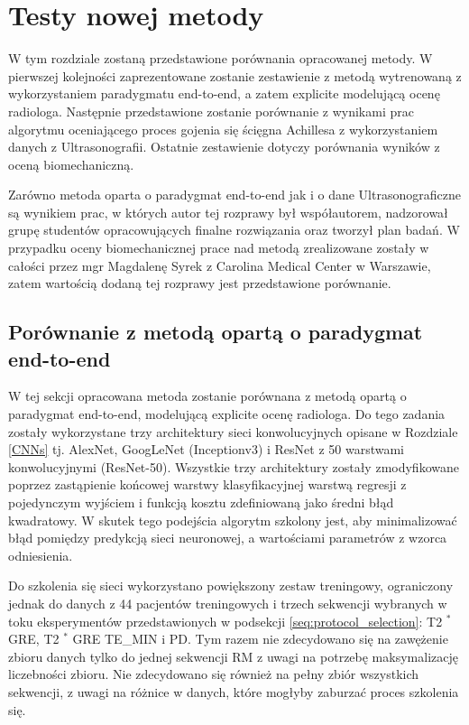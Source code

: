 \chapter{Testy nowej metody}

W tym rozdziale zostaną przedstawione porównania opracowanej metody. W pierwszej kolejności zaprezentowane zostanie zestawienie z metodą wytrenowaną z wykorzystaniem paradygmatu end-to-end, a zatem explicite modelującą ocenę radiologa. Następnie przedstawione zostanie porównanie z wynikami prac algorytmu oceniającego proces gojenia się ścięgna Achillesa z wykorzystaniem danych z Ultrasonografii. Ostatnie zestawienie dotyczy porównania wyników z oceną biomechaniczną.

Zarówno metoda oparta o paradygmat end-to-end jak i o dane Ultrasonograficzne są wynikiem prac, w których autor tej rozprawy był współautorem, nadzorował grupę studentów opracowujących finalne rozwiązania oraz tworzył plan badań. W przypadku oceny biomechanicznej prace nad metodą zrealizowane zostały w całości przez mgr Magdalenę Syrek z Carolina Medical Center w Warszawie, zatem wartością dodaną tej rozprawy jest przedstawione porównanie.   

\section{Porównanie z metodą opartą o paradygmat end-to-end}
\label{seq:end-to-end}
W tej sekcji opracowana metoda zostanie porównana z metodą opartą o paradygmat end-to-end, modelującą explicite ocenę radiologa. Do tego zadania zostały wykorzystane trzy architektury sieci konwolucyjnych opisane w Rozdziale \ref{CNNs} tj. AlexNet, GoogLeNet (Inceptionv3) i ResNet z 50 warstwami konwolucyjnymi (ResNet-50). Wszystkie trzy architektury zostały zmodyfikowane poprzez zastąpienie końcowej warstwy klasyfikacyjnej warstwą regresji z pojedynczym wyjściem i funkcją kosztu zdefiniowaną jako średni błąd kwadratowy. W skutek tego podejścia algorytm szkolony jest, aby minimalizować błąd pomiędzy predykcją sieci neuronowej, a wartościami parametrów z wzorca odniesienia. 

Do szkolenia się sieci wykorzystano powiększony zestaw treningowy, ograniczony jednak do danych z 44 pacjentów treningowych i trzech sekwencji wybranych w toku eksperymentów przedstawionych w podsekcji \ref{seq:protocol_selection}: T2 $^\ast$ GRE, T2 $^\ast$ GRE TE\_MIN i PD. Tym razem nie zdecydowano się na zawężenie zbioru danych tylko do jednej sekwencji RM z uwagi na potrzebę maksymalizację liczebności zbioru. Nie zdecydowano się również na pełny zbiór wszystkich sekwencji, z uwagi na różnice w danych, które mogłyby zaburzać proces szkolenia się. 

